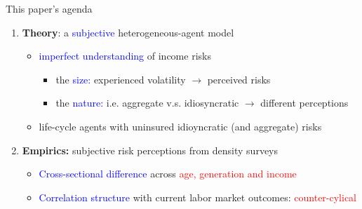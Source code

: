 \documentclass{beamer}
\begin{document}
\begin{frame}{This paper's agenda}
	
	\begin{enumerate}
		\item \textbf{Theory}: a \textcolor{blue}{subjective} heterogeneous-agent model 
		\begin{itemize}
			\item  \textcolor{blue}{imperfect understanding} of income risks
			\begin{itemize}
				\item the \textcolor{blue}{size:} experienced volatility $\rightarrow$  perceived risks
				\item the \textcolor{blue}{nature:} i.e.  aggregate v.s. idiosyncratic  $\rightarrow$ different perceptions
			\end{itemize}
			\item life-cycle agents with uninsured idioyncratic (and aggregate) risks
		\end{itemize} 
		\item \textbf{Empirics:} subjective risk perceptions from density surveys
		\begin{itemize}
			\item \textcolor{blue}{Cross-sectional difference} across \textcolor{red}{age, generation and income} 
			\item \textcolor{blue}{Correlation structure} with current labor market outcomes: \textcolor{red}{counter-cylical} 
		\end{itemize}
		
	\end{enumerate}
\end{frame}
\end{document}

